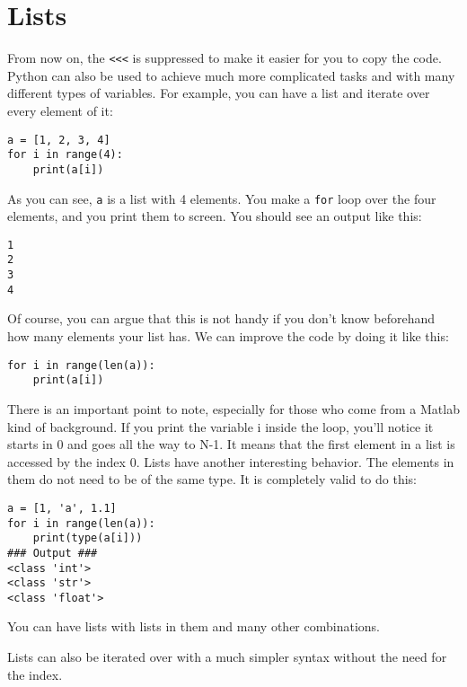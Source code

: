 \section{Lists}\label{lists}
From now on, the \texttt{<<<} is suppressed to make it easier for you to copy the code. Python can also be used to achieve much more complicated tasks and with many different types of variables. For example, you can have a list and iterate over every element of it:

\begin{verbatim}
a = [1, 2, 3, 4]
for i in range(4):
    print(a[i])
\end{verbatim}

As you can see, \texttt{a} is a list with 4 elements. You make a
\texttt{for} loop over the four elements, and you print them to screen.
You should see an output like this:

\begin{verbatim}
1
2
3
4
\end{verbatim}

Of course, you can argue that this is not handy if you don't know beforehand how many elements your list has. We can improve the code by doing it like this:

\begin{verbatim}
for i in range(len(a)):
    print(a[i])
\end{verbatim}

There is an important point to note, especially for those who come from a Matlab kind of background. If you print the variable i inside the loop, you'll notice it starts in 0 and goes all the way to N-1. It means that the first element in a list is accessed by the index 0. Lists have another interesting behavior. The elements in them do not need to be of the same type. It is completely valid to do this:

\begin{verbatim}
a = [1, 'a', 1.1]
for i in range(len(a)):
    print(type(a[i]))
### Output ###
<class 'int'>
<class 'str'>
<class 'float'>
\end{verbatim}

You can have lists with lists in them and many other combinations.


Lists can also be iterated over with a much simpler syntax without the need for the index.

